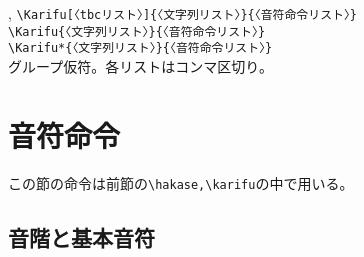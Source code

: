 \documentclass[a4paper,luatex]{l3doc}
\begin{document}
\begin{function}{\Karifu,\Karifu*}
 \verb|\Karifu[〈tbcリスト〉]{〈文字列リスト〉}{〈音符命令リスト〉}|\\
 \verb|\Karifu{〈文字列リスト〉}{〈音符命令リスト〉}|\\
 \verb|\Karifu*{〈文字列リスト〉}{〈音符命令リスト〉}|\\
グループ仮符。各リストはコンマ区切り。
\end{function}
\section{音符命令}
この節の命令は前節の\verb|\hakase,\karifu|の中で用いる。
\setlength{\columnseprule}{0.5pt}
\subsection{音階と基本音符}
\end{document}
